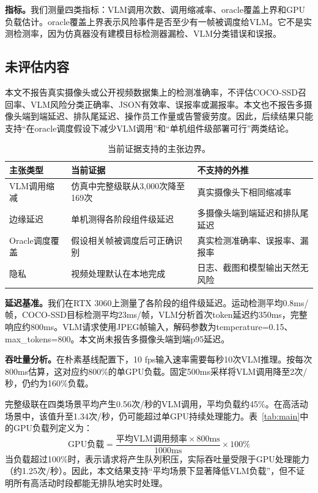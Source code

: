\documentclass[a4paper,10pt]{ctexart}
\begin{document}
\textbf{指标。}我们测量四类指标：VLM调用次数、调用缩减率、oracle覆盖上界和GPU负载估计。oracle覆盖上界表示风险事件是否至少有一帧被调度给VLM。它不是实测检测率，因为仿真器没有建模目标检测器漏检、VLM分类错误和误报。

\subsection{未评估内容}

本文不报告真实摄像头或公开视频数据集上的检测准确率，不评估COCO-SSD召回率、VLM风险分类正确率、JSON有效率、误报率或漏报率。本文也不报告多摄像头端到端延迟、排队尾延迟、操作员工作量或告警疲劳度。因此，后续结果只能支持``在oracle调度假设下减少VLM调用''和``单机组件级部署可行''两类结论。

\begin{table}[t]
\centering
\caption{当前证据支持的主张边界。}
\label{tab:claims}
\small
\begin{tabular}{p{3.2cm}p{5.2cm}p{4.2cm}}
\toprule
主张类型 & 当前证据 & 不支持的外推 \\
\midrule
VLM调用缩减 & 仿真中完整级联从3,000次降至169次 & 真实摄像头下相同缩减率 \\
边缘延迟 & 单机测得各阶段组件级延迟 & 多摄像头端到端延迟和排队尾延迟 \\
Oracle调度覆盖 & 假设相关帧被调度后可正确识别 & 真实检测准确率、误报率、漏报率 \\
隐私 & 视频处理默认在本地完成 & 日志、截图和模型输出天然无风险 \\
\bottomrule
\end{tabular}
\end{table}

\textbf{延迟基准。}我们在RTX 3060上测量了各阶段的组件级延迟。运动检测平均0.8ms/帧，COCO-SSD目标检测平均23ms/帧，VLM分析首次token延迟约350ms，完整响应约800ms。VLM请求使用JPEG帧输入，解码参数为temperature=0.15、max\_tokens=800。本文尚未报告多摄像头端到端p95延迟。

\textbf{吞吐量分析。}在朴素基线配置下，10 fps输入速率需要每秒10次VLM推理。按每次800ms估算，这对应约800\%的单GPU负载。固定500ms采样将VLM调用降至2次/秒，仍约为160\%负载。

完整级联在四类场景平均产生0.56次/秒的VLM调用，平均负载约45\%。在高活动场景中，该值升至1.34次/秒，仍可能超过单GPU持续处理能力。表~\ref{tab:main}中的GPU负载列定义为：
\begin{equation}
\text{GPU负载} = \frac{\text{平均VLM调用频率} \times 800\text{ms}}{1000\text{ms}} \times 100\%
\end{equation}
当负载超过100\%时，表示请求将产生队列积压，实际吞吐量受限于GPU处理能力（约1.25次/秒）。因此，本文结果支持``平均场景下显著降低VLM负载''，但不证明所有高活动时段都能无排队地实时处理。
\end{document}
